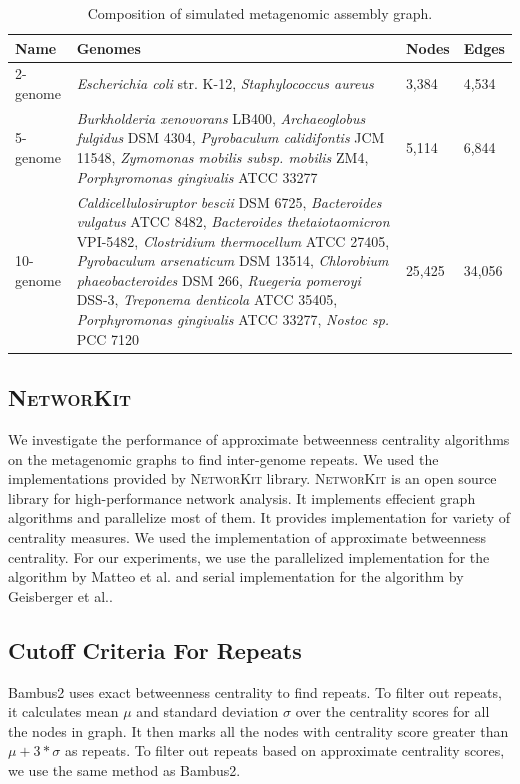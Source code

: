 \documentclass[runningheads,a4paper]{llncs}
\begin{document}
\begin{table}[h]
\centering
\caption[]{Composition of simulated metagenomic assembly graph.}
\begin{tabularx}{\linewidth}{|l|X|l|l|}
\hline
\textbf{Name} & \textbf{Genomes} & \textbf{Nodes} & \textbf{Edges} \\
\hline
2-genome & \textit{Escherichia coli} str. K-12, \textit{Staphylococcus aureus}  & 3,384 & 4,534 \\
\hline
5-genome & \textit{Burkholderia xenovorans} LB400, \textit{Archaeoglobus fulgidus} DSM 4304,  \textit{Pyrobaculum calidifontis} JCM 11548, \textit{Zymomonas mobilis subsp. mobilis} ZM4, \textit{Porphyromonas gingivalis} ATCC 33277 & 5,114 & 6,844  \\
\hline
10-genome  & \textit{Caldicellulosiruptor bescii} DSM 6725, \textit{Bacteroides vulgatus} ATCC 8482, 
 \textit{Bacteroides thetaiotaomicron} VPI-5482, \textit{Clostridium thermocellum} ATCC 27405, 
 \textit{Pyrobaculum arsenaticum} DSM 13514, \textit{Chlorobium phaeobacteroides} DSM 266, 
 \textit{Ruegeria pomeroyi} DSS-3, \textit{Treponema denticola} ATCC 35405, 
 \textit{Porphyromonas gingivalis} ATCC 33277, \textit{Nostoc sp.} PCC 7120  & 25,425 & 34,056\\
\hline 
\end{tabularx}
\label{tab:composition}
\end{table}

\subsection*{\textsc{NetworKit}}
We investigate the performance of approximate betweenness centrality algorithms on the metagenomic graphs to find inter-genome repeats. We used the implementations provided by \textsc{NetworKit}\cite{networkit} library. \textsc{NetworKit} is an open source library for high-performance network analysis. It implements effecient graph algorithms and parallelize most of them. It provides implementation for variety of centrality measures. We used the implementation of approximate betweenness centrality. For our experiments, we use the parallelized implementation for the algorithm by Matteo et al.\cite{matteo} and serial implementation for the algorithm by Geisberger et al.\cite{sanders}.


\subsection*{Cutoff Criteria For Repeats}
Bambus2\cite{bambus} uses exact betweenness centrality to find repeats. To filter out repeats, it calculates mean $\mu$ and standard deviation $\sigma$ over the centrality scores for all the nodes in graph. It then marks all the nodes with centrality score greater than $\mu + 3*\sigma$ as repeats. To filter out repeats based on approximate centrality scores, we use the same method as Bambus2. 
\end{document}
